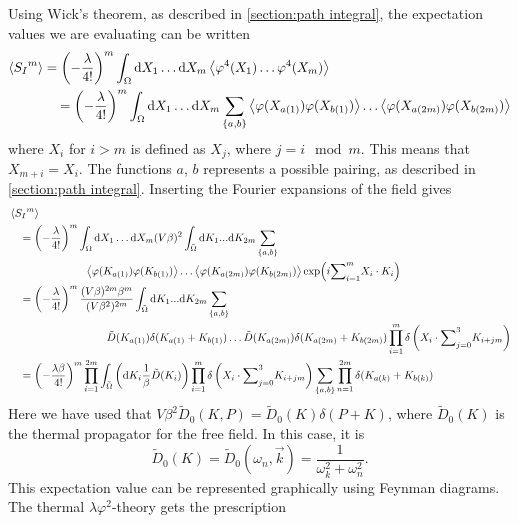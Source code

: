 Using Wick's theorem, as described in \autoref{section:path integral}, the expectation values we are evaluating can be written
\begin{align*}
    \ex{{S_I}^m} & 
    = \left(- \frac{\lambda }{4!}\right)^m 
    \int_{\Omega} \dd X_1 \dots \dd X_m
    \ex{\varphi^4(X_1) \dots \varphi^4(X_m)} \\ 
    & \quad
    = \left(- \frac{\lambda }{4!}\right)^m 
    \int_{\Omega} \dd X_1 \dots \dd X_m \sum_{\{a, b\}}
    \ex{\varphi(X_{a(1)}) \varphi(X_{b(1)})} 
    \dots
    \ex{\varphi(X_{a(2m)}) \varphi(X_{b(2m)})}
\end{align*}
where $X_i$ for $i>m$ is defined as $X_j$, where $j = i \mod m$.
This means that $X_{m + i} = X_i$.
The functions $a,\,b$ represents a possible pairing, as described in \autoref{section:path integral}.
Inserting the Fourier expansions of the field gives
\begin{align*}
    & \ex{{S_I}^m} \\ 
    &\quad 
    = \left(-\frac{\lambda }{4!}\right)^m 
    \int_{\Omega} \dd X_1 \dots \dd X_m
    (V \beta)^2 \int_{\tilde \Omega} \dd K_1 ... \dd K_{2m} \sum_{\{a, b\}} \\
    & \quad \quad \quad \quad\quad \quad \quad
    \ex{\varphi(K_{a(1)}) \varphi(K_{b(1)})} 
    \dots
    \ex{\varphi(K_{a(2m)}) \varphi(K_{b(2m)})}     
    \exp(i {\sum}_{i=1}^{m} X_i \cdot K_i)\\ 
    & \quad  
    = \left(-\frac{\lambda }{4!}\right)^m 
    \frac{(V \beta)^{2m} \beta^m}{(V \beta^2)^{2m}}
    \int_{\tilde \Omega} \dd K_1 ... \dd K_{2m} \sum_{\{a, b\}} \\
    & \quad \quad \quad \quad \quad \quad \quad \quad \quad
    \tilde D(K_{a(1)}) \delta(K_{a(1)} + K_{b(1)}) \dots 
    \tilde D(K_{a(2m)}) \delta(K_{a(2m)} + K_{b(2m)})
    \prod_{i=1}^m \delta\left(X_i \cdot {\sum}_{j=0}^3 K_{i + jm}\right) \\
    & \quad 
    = \left(-\frac{\lambda \beta}{4!}\right)^m 
    \prod_{i=1}^{2m} \int_{\tilde \Omega} 
    \left( \dd K_i \frac{1}{\beta} \tilde D(K_i)  \right) 
    \prod_{i=1}^m \delta\left(X_i \cdot {\sum}_{j=0}^3 K_{i + jm}\right)
    \sum_{\{a, b\}} 
    \prod_{n=1}^{2m}\delta(K_{a(k)} + K_{b(k)})
\end{align*}
Here we have used that $V \beta^2 \tilde D_0(K, P) = \tilde D_0(K) \delta(P + K)$, where $\tilde D_0(K)$ is the thermal propagator for the free field.
In this case, it is
\begin{equation}
    \tilde D_0(K) = \tilde D_0(\omega_n, \vec k) = \frac{1}{\omega_k^2 + \omega_n^2}.
\end{equation}
This expectation value can be represented graphically using Feynman diagrams.
The thermal $\lambda \varphi^2$-theory gets the prescription


